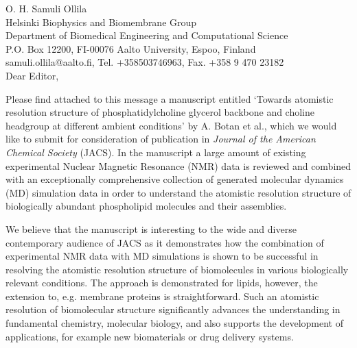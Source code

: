 \documentclass[11pt]{letter}
\begin{document}
\reversemarginpar
\pagestyle{empty}
\noindent O. H. Samuli Ollila \\
\noindent Helsinki Biophysics and Biomembrane Group\\
\noindent Department of Biomedical Engineering and Computational Science\\
\noindent P.O. Box 12200, FI-00076 Aalto University, Espoo, Finland\\
\noindent samuli.ollila@aalto.fi, Tel. +358503746963, Fax. +358 9 470 23182 \\


%
%

Dear Editor,

Please find attached to this message a manuscript entitled `Towards atomistic resolution structure of phosphatidylcholine 
glycerol backbone and choline headgroup at different ambient conditions' by A. Botan et al., which we would like to submit 
for consideration of publication in \textit{Journal of the American Chemical Society} (JACS). In the manuscript a large amount of
existing experimental Nuclear Magnetic Resonance (NMR) data is reviewed and combined with an exceptionally comprehensive 
collection of generated molecular dynamics (MD) simulation data in order to understand the atomistic resolution structure 
of biologically abundant phospholipid molecules and their assemblies.

We believe that the manuscript is interesting to the wide and diverse contemporary audience of
JACS as it demonstrates how the combination of experimental NMR data with MD simulations is shown 
to be successful in resolving the atomistic resolution structure of biomolecules in various biologically 
relevant conditions. The approach is demonstrated for lipids, however, the extension to, e.g. membrane 
proteins is straightforward. Such an atomistic resolution of biomolecular structure significantly advances 
the understanding in fundamental chemistry, molecular biology, and also supports the development of applications, 
for example new biomaterials or drug delivery systems.
\end{document}
